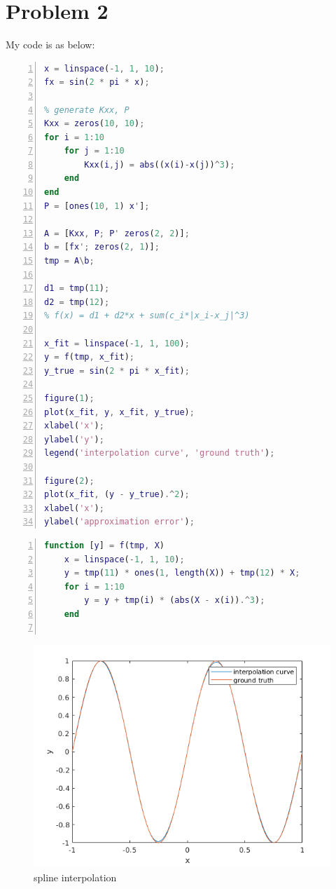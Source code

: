\documentclass[a4paper, 11pt]{article}
\begin{document}
\section*{Problem 2}
My code is as below:
\begin{lstlisting}[language = Matlab, numbers=left,   
  numberstyle=\tiny,keywordstyle=\color{blue!70},  
  commentstyle=\color{red!50!green!50!blue!50},frame=shadowbox,  
  rulesepcolor=\color{red!20!green!20!blue!20},basicstyle=\ttfamily,
  tabsize=2]
x = linspace(-1, 1, 10);
fx = sin(2 * pi * x);

% generate Kxx, P
Kxx = zeros(10, 10);
for i = 1:10
	for j = 1:10
		Kxx(i,j) = abs((x(i)-x(j))^3);
	end
end
P = [ones(10, 1) x'];

A = [Kxx, P; P' zeros(2, 2)];
b = [fx'; zeros(2, 1)];
tmp = A\b;

d1 = tmp(11);
d2 = tmp(12);
% f(x) = d1 + d2*x + sum(c_i*|x_i-x_j|^3)

x_fit = linspace(-1, 1, 100);
y = f(tmp, x_fit);
y_true = sin(2 * pi * x_fit);

figure(1);
plot(x_fit, y, x_fit, y_true);
xlabel('x');
ylabel('y');
legend('interpolation curve', 'ground truth');

figure(2);
plot(x_fit, (y - y_true).^2);
xlabel('x');
ylabel('approximation error');
\end{lstlisting}
\begin{lstlisting}[language = Matlab, numbers=left,   
  numberstyle=\tiny,keywordstyle=\color{blue!70},  
  commentstyle=\color{red!50!green!50!blue!50},frame=shadowbox,  
  rulesepcolor=\color{red!20!green!20!blue!20},basicstyle=\ttfamily,
  tabsize=2]
function [y] = f(tmp, X)
	x = linspace(-1, 1, 10);
	y = tmp(11) * ones(1, length(X)) + tmp(12) * X;
	for i = 1:10
		y = y + tmp(i) * (abs(X - x(i)).^3);
	end
	  
\end{lstlisting}
\begin{figure}[htbp]
\centering
	\includegraphics[scale=1.0]{figure/p2_1.png}
	\caption{spline interpolation}
	\label{fig2_1}
\end{figure}
\end{document}
